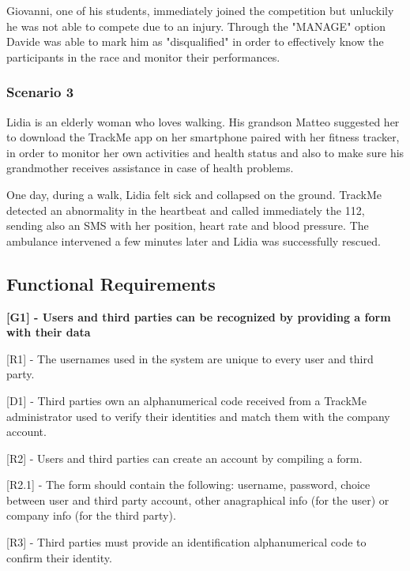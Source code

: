 Giovanni, one of his students, immediately joined the competition but unluckily he was not able to compete due to an injury. Through the "MANAGE" option Davide was able to mark him as "disqualified" in order to effectively know the participants in the race and monitor their performances.

\subsubsection{Scenario 3}
Lidia is an elderly woman who loves walking. His grandson Matteo suggested her to download the TrackMe app on her smartphone paired with her fitness tracker, in order to monitor her own activities and health status and also to make sure his grandmother receives assistance in case of health problems.

One day, during a walk, Lidia felt sick and collapsed on the ground. TrackMe detected an abnormality in the heartbeat and called immediately the 112, sending also an SMS with her position, heart rate and blood pressure. The ambulance intervened a few minutes later and Lidia was successfully rescued.

\subsection{Functional Requirements}
\hspace{-\parindent}\textbf{[G1] - Users and third parties can be recognized by providing a form with their data} \newline

[R1] -  The usernames used in the system are unique to every user and third party. \newline

[D1] - Third parties own an alphanumerical code received from a TrackMe administrator used to verify their identities and match them with the company account. \newline

[R2] - Users and third parties can create an account by compiling a form. \newline

\hspace{\parindent}[R2.1] - The form should contain the following: username, password, choice between user and third party account, other anagraphical info (for the user) or company info (for the third party). \newline

[R3] - Third parties must provide an identification alphanumerical code to confirm their identity. \newline

